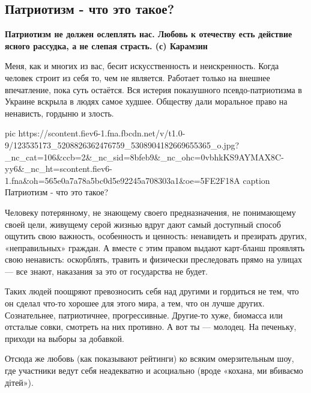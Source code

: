  
 
 

\subsection{Патриотизм - что это такое?}
\label{sec:02_11_2020.fb.ekaterina_zharkih.1.patriotism}


\textbf{Патриотизм не должен ослеплять нас. Любовь к отечеству есть действие ясного рассудка, а не слепая страсть.
(с) Карамзин}

Меня, как и многих из вас, бесит искусственность и неискренность. Когда человек
строит из себя то, чем не является. Работает только на внешнее впечатление,
пока суть остаётся.  Вся истерия показушного псевдо-патриотизма в Украине
вскрыла в людях самое худшее. Обществу дали моральное право на ненависть,
гордыню и злость.

\ifcmt
pic https://scontent.fiev6-1.fna.fbcdn.net/v/t1.0-9/123535173_5208826362476759_5308904182669655365_o.jpg?_nc_cat=106&ccb=2&_nc_sid=8bfeb9&_nc_ohc=0vbhkKS9AYMAX8C-yy6&_nc_ht=scontent.fiev6-1.fna&oh=565e0a7a78a5bc0d5e92245a708303a1&oe=5FE2F18A
caption Патриотизм - что это такое?
\fi

Человеку потерянному, не знающему своего предназначения, не понимающему своей
цели, живущему серой жизнью вдруг дают самый доступный способ ощутить свою
важность, особенность и ценность: ненавидеть и презирать других, «неправильных»
граждан. А вместе с этим правом выдают карт-бланш проявлять свою ненависть:
оскорблять, травить и физически преследовать прямо на улицах --- все знают,
наказания за это от государства не будет. 

Таких людей поощряют превозносить себя над другими и гордиться не тем, что он
сделал что-то хорошее для этого мира, а тем, что он лучше других. Сознательнее,
патриотичнее, прогрессивные. Другие-то хуже, биомасса или отсталые совки,
смотреть на них противно. А вот ты --- молодец. На печеньку, приходи на выборы за
добавкой. 

Отсюда же любовь (как показывают рейтинги) ко всяким омерзительным шоу, где
участники ведут себя неадекватно и асоциально (вроде «кохана, ми вбиваємо
дітей»). 

